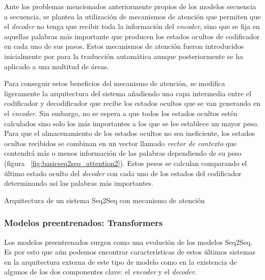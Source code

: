 Ante los problemas mencionados anteriormente propios de los modelos secuencia a secuencia, se plantea la utilización de mecanismos de atención que permiten que el \textit{decoder} no tenga que recibir toda la información del \textit{encoder}, sino que se fija en aquellas palabras más importante que producen los estados ocultos de codificador en cada uno de sus pasos. Estos mecanismos de atención fueron introducidos inicialmente por \cite{Bahdanau} para la traducción automática aunque posteriormente se ha aplicado a una multitud de áreas. 


Para conseguir estos beneficios del mecanismo de atención, se modifica ligeramente la arquitectura del sistema añadiendo una capa intermedia entre el codificador y decodificador que recibe los estados ocultos que se van generando en el \textit{encoder}. Sin embargo, no se espera a que todos los estados ocultos estén calculados sino solo los más importantes a los que se les establece un mayor peso. Para que el almacenamiento de los estados ocultos no sea ineficiente, los estados ocultos recibidos se combinan en un vector llamado \textit{vector de contexto} que contendrá más o menos información de las palabras dependiendo de su peso (figura ~\ref{fig:basicseq2seq_attention2}). Estos pesos se calculan comparando el último estado oculto del \textit{decoder} con cada uno de los estados del codificador determinando así las palabras más importantes.


%
{Arquitectura de un sistema Seq2Seq con mecanismo de atención}



\subsubsection{Modelos preentrenados: Transformers}
Los modelos preentrenados surgen como una evolución de los modelos Seq2Seq. Es por esto que aún podemos encontrar características de estos últimos sistemas
en la arquitectura externa de este tipo de modelo como en la existencia de algunos de los dos componentes clave: el \textit{encoder} y el \textit{decoder}. 

